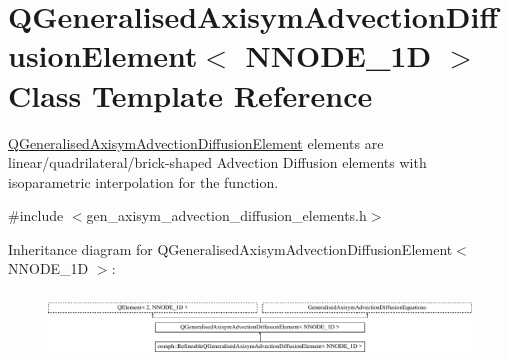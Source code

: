 \hypertarget{classQGeneralisedAxisymAdvectionDiffusionElement}{}\section{Q\+Generalised\+Axisym\+Advection\+Diffusion\+Element$<$ N\+N\+O\+D\+E\+\_\+1D $>$ Class Template Reference}
\label{classQGeneralisedAxisymAdvectionDiffusionElement}


\hyperlink{classQGeneralisedAxisymAdvectionDiffusionElement}{Q\+Generalised\+Axisym\+Advection\+Diffusion\+Element} elements are linear/quadrilateral/brick-\/shaped Advection Diffusion elements with isoparametric interpolation for the function.  




{\ttfamily \#include $<$gen\+\_\+axisym\+\_\+advection\+\_\+diffusion\+\_\+elements.\+h$>$}

Inheritance diagram for Q\+Generalised\+Axisym\+Advection\+Diffusion\+Element$<$ N\+N\+O\+D\+E\+\_\+1D $>$\+:\begin{figure}[H]
\begin{center}
\leavevmode
\includegraphics[height=1.735537cm]{classQGeneralisedAxisymAdvectionDiffusionElement}
\end{center}
\end{figure}
